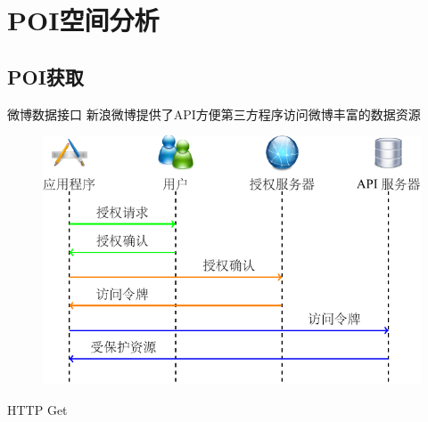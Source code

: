 \section{POI空间分析}

\subsection{POI获取}

\begin{frame}[c]{微博数据接口}
    新浪微博提供了API方便第三方程序访问微博丰富的数据资源

    \begin{figure}
        \includegraphics[scale=0.8]{figures/api.pdf}
    \end{figure}

    \pause
    \alert{HTTP Get}
\end{frame}

    


